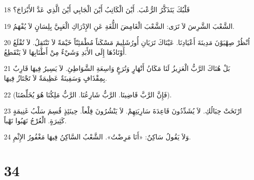 \par 18 قَلْبُكَ يَتَذَكَّرُ الرُّعْبَ. أَيْنَ الْكَاتِبُ أَيْنَ الْجَابِي أَيْنَ الَّذِي عَدَّ الأَبْرَاجَ؟
\par 19 الشَّعْبَ الشَّرِسَ لاَ تَرَى: الشَّعْبَ الْغَامِضَ اللُّغَةِ عَنِ الإِدْرَاكِ الْعَيِيَّ بِلِسَانٍ لاَ يُفْهَمُ.
\par 20 اُنْظُرْ صِهْيَوْنَ مَدِينَةَ أَعْيَادِنَا. عَيْنَاكَ تَرَيَانِ أُورُشَلِيمَ مَسْكَناً مُطْمَئِنّاً خَيْمَةً لاَ تَنْتَقِلُ. لاَ تُقْلَعُ أَوْتَادُهَا إِلَى الأَبَدِ وَشَيْءٌ مِنْ أَطْنَابِهَا لاَ يَنْقَطِعُ.
\par 21 بَلْ هُنَاكَ الرَّبُّ الْعَزِيزُ لَنَا مَكَانُ أَنْهَارٍ وَتُرَعٍ وَاسِعَةِ الشَّوَاطِئِ. لاَ يَسِيرُ فِيهَا قَارِبٌ بِمِقْذَافٍ وَسَفِينَةٌ عَظِيمَةٌ لاَ تَجْتَازُ فِيهَا.
\par 22 (فَإِنَّ الرَّبَّ قَاضِينَا. الرَّبُّ شَارِعُنَا. الرَّبُّ مَلِكُنَا هُوَ يُخَلِّصُنَا).
\par 23 ارْتَخَتْ حِبَالُكِ. لاَ يُشَدِّدُونَ قَاعِدَةَ سَارِيَتِهِمْ. لاَ يَنْشُرُونَ قِلْعاً. حِينَئِذٍ قُسِمَ سَلْبُ غَنِيمَةٍ كَثِيرَةٍ. الْعُرْجُ نَهَبُوا نَهْباً.
\par 24 وَلاَ يَقُولُ سَاكِنٌ: «أَنَا مَرِضْتُ». الشَّعْبُ السَّاكِنُ فِيهَا مَغْفُورُ الإِثْمِ.

\chapter{34}

